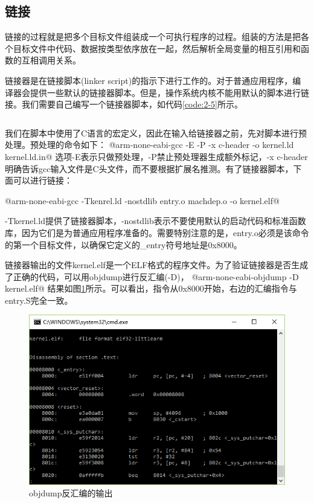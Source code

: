\documentclass[main.tex]{subfiles}
\begin{document}
\begin{CJK*}{UTF8}{song}
\section{链接}
链接的过程就是把多个目标文件组装成一个可执行程序的过程。组装的方法是把各个目标文件中代码、数据按类型依序放在一起，然后解析全局变量的相互引用和函数的互相调用关系。
\par
链接器是在链接脚本(linker script)的指示下进行工作的。对于普通应用程序，编译器会提供一些默认的链接器脚本。但是，操作系统内核不能用默认的脚本进行链接。我们需要自己编写一个链接器脚本，如代码\ref{code:2-5}所示。

\begin{code}
\label{code:2-5}
\inputminted[linenos,numbersep=5pt,frame=lines,framesep=2mm]{c}{src/chapter02/kernel/kernel.ld.in}
\end{code}


我们在脚本中使用了C语言的宏定义，因此在输入给链接器之前，先对脚本进行预处理。预处理的命令如下：
@arm-none-eabi-gcc -E -P -x c-header -o kernel.ld kernel.ld.in@
\noindent
选项-E表示只做预处理，-P禁止预处理器生成额外标记，-x c-header明确告诉gcc输入文件是C头文件，而不要根据扩展名推测。有了链接器脚本，下面可以进行链接：

@arm-none-eabi-gcc -Tkenrel.ld -nostdlib entry.o machdep.o -o kernel.elf@

\noindent
-Tkernel.ld提供了链接器脚本，-nostdlib表示不要使用默认的启动代码和标准函数库，因为它们是为普通应用程序准备的。需要特别注意的是，entry.o必须是该命令的第一个目标文件，以确保它定义的\_entry符号地址是0x8000。
\par
链接器输出的文件kernel.elf是一个ELF格式的程序文件。为了验证链接器是否生成了正确的代码，可以用objdump进行反汇编(-D)，
@arm-none-eabi-objdump -D kernel.elf@
\noindent
结果如图\ref{figure:2-1}所示。可以看出，指令从0x8000开始，右边的汇编指令与entry.S完全一致。

\begin{figure}[htp]
\centering
\includegraphics[scale=0.5]{figures/2-1.png}
\caption{objdump反汇编的输出}
\label{figure:2-1}
\end{figure}


\end{CJK*}
\end{document}
